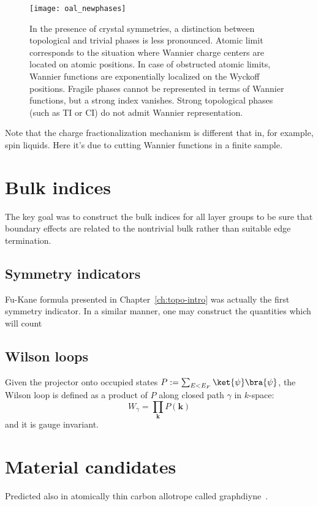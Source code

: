 \begin{figure}
\centering
\texttt{[image: oal\_newphases]}
\caption{In the presence of crystal symmetries, a distinction between topological and trivial phases is less pronounced. Atomic limit corresponds to the situation where Wannier charge centers are located on atomic positions. In case of obstructed atomic limits, Wannier functions are exponentially localized on the Wyckoff positions. Fragile phases cannot be represented in terms of Wannier functions, but a strong index vanishes. Strong topological phases (such as TI or CI) do not admit Wannier representation.}
\label{fig:newphases}
\end{figure}






Note that the charge fractionalization mechanism is different that in, for example, spin liquids. Here it's due to cutting Wannier functions in a finite sample.




\section{Bulk indices}
The key goal was to construct the bulk indices for all layer groups to be sure that boundary effects are related to the nontrivial bulk rather than suitable edge termination.



\subsection{Symmetry indicators}
Fu-Kane formula presented in Chapter~\ref{ch:topo-intro} was actually the first symmetry indicator. In a similar manner, one may construct the quantities which will count


\subsection{Wilson loops}

Given the projector onto occupied states $P:= \sum_{E < E_F} \ket{\psi} \bra{\psi}$, the Wilson loop is defined as a product of $P$ along closed path $\gamma$ in $k$-space:
\begin{equation}
W_{\gamma} = \prod_{\mathbf{k}} P ( \mathbf{k}) 
\label{eq:wilson}
\end{equation}
and it is gauge invariant.

\section{Material candidates}
Predicted also in atomically thin carbon allotrope called graphdiyne~\cite{GDY12019, GDY22019}.


